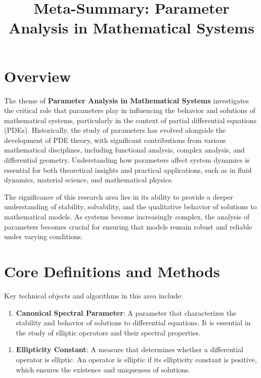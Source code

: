 \documentclass[11pt,a4paper]{article}
\title{Meta-Summary: Parameter Analysis in Mathematical Systems}
\date{}
\begin{document}
\maketitle

\section{Overview}
The theme of \textbf{Parameter Analysis in Mathematical Systems} investigates the critical role that parameters play in influencing the behavior and solutions of mathematical systems, particularly in the context of partial differential equations (PDEs). Historically, the study of parameters has evolved alongside the development of PDE theory, with significant contributions from various mathematical disciplines, including functional analysis, complex analysis, and differential geometry. Understanding how parameters affect system dynamics is essential for both theoretical insights and practical applications, such as in fluid dynamics, material science, and mathematical physics.

The significance of this research area lies in its ability to provide a deeper understanding of stability, solvability, and the qualitative behavior of solutions to mathematical models. As systems become increasingly complex, the analysis of parameters becomes crucial for ensuring that models remain robust and reliable under varying conditions.

\section{Core Definitions and Methods}
Key technical objects and algorithms in this area include:

\begin{enumerate}
\item \textbf{Canonical Spectral Parameter}: A parameter that characterizes the stability and behavior of solutions to differential equations. It is essential in the study of elliptic operators and their spectral properties.
\end{enumerate}

\begin{enumerate}
\item \textbf{Ellipticity Constant}: A measure that determines whether a differential operator is elliptic. An operator is elliptic if its ellipticity constant is positive, which ensures the existence and uniqueness of solutions.
\end{enumerate}
\end{document}
